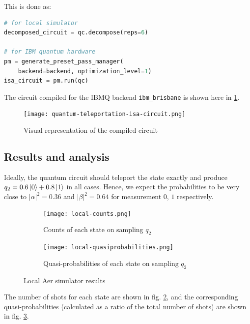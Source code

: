 \documentclass[11pt,a4paper]{article}
\begin{document}
This is done as:
\begin{lstlisting}[language=Python]
# for local simulator
decomposed_circuit = qc.decompose(reps=6)

# for IBM quantum hardware
pm = generate_preset_pass_manager(
    backend=backend, optimization_level=1)
isa_circuit = pm.run(qc)
\end{lstlisting}

The circuit compiled for the IBMQ backend \texttt{ibm\_brisbane} is shown here in \ref{fig:quantum-teleportation-isa-circuit}.

\begin{figure}[H]
    \centering
    \texttt{[image: quantum-teleportation-isa-circuit.png]}
    \caption{Visual representation of the compiled circuit}
    \label{fig:quantum-teleportation-isa-circuit}
\end{figure}

\subsection{Results and analysis}

Ideally, the quantum circuit should teleport the state exactly and produce $q_2 = 0.6\ket{0} + 0.8\ket{1}$ in all cases. Hence, we expect the probabilities to be very close to $|\alpha|^2 = 0.36$ and $|\beta|^2 = 0.64$ for measurement $0$, $1$ respectively.

\begin{figure}[H]
    \centering
    \begin{subfigure}[t]{0.45\textwidth}
        \centering
        \texttt{[image: local-counts.png]} %
        \caption{Counts of each state on sampling $q_2$}
        \label{fig:local-counts}
    \end{subfigure}
    \hfill
    \begin{subfigure}[t]{0.45\textwidth}
        \centering
        \texttt{[image: local-quasiprobabilities.png]} %
        \caption{Quasi-probabilities of each state on sampling $q_2$}
        \label{fig:local-quasiprobabilities}
    \end{subfigure}
    \caption{Local Aer simulator results}
    \label{fig:local}
\end{figure}

The number of shots for each state are shown in fig. \ref{fig:local-counts}, and the corresponding quasi-probabilities (calculated as a ratio of the total number of shots) are shown in fig. \ref{fig:local-quasiprobabilities}.
\end{document}
